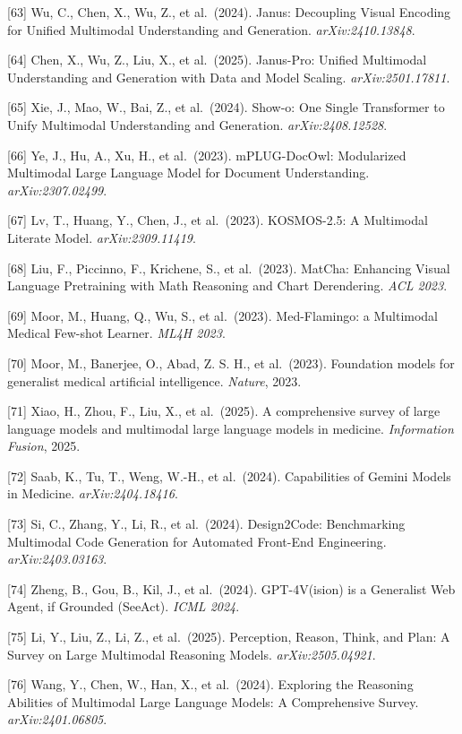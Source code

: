{[}63{]} Wu, C., Chen, X., Wu, Z., et al.~(2024). Janus: Decoupling Visual Encoding for Unified Multimodal Understanding and Generation. \emph{arXiv:2410.13848}.

{[}64{]} Chen, X., Wu, Z., Liu, X., et al.~(2025). Janus-Pro: Unified Multimodal Understanding and Generation with Data and Model Scaling. \emph{arXiv:2501.17811}.

{[}65{]} Xie, J., Mao, W., Bai, Z., et al.~(2024). Show-o: One Single Transformer to Unify Multimodal Understanding and Generation. \emph{arXiv:2408.12528}.

{[}66{]} Ye, J., Hu, A., Xu, H., et al.~(2023). mPLUG-DocOwl: Modularized Multimodal Large Language Model for Document Understanding. \emph{arXiv:2307.02499}.

{[}67{]} Lv, T., Huang, Y., Chen, J., et al.~(2023). KOSMOS-2.5: A Multimodal Literate Model. \emph{arXiv:2309.11419}.

{[}68{]} Liu, F., Piccinno, F., Krichene, S., et al.~(2023). MatCha: Enhancing Visual Language Pretraining with Math Reasoning and Chart Derendering. \emph{ACL 2023}.

{[}69{]} Moor, M., Huang, Q., Wu, S., et al.~(2023). Med-Flamingo: a Multimodal Medical Few-shot Learner. \emph{ML4H 2023}.

{[}70{]} Moor, M., Banerjee, O., Abad, Z. S. H., et al.~(2023). Foundation models for generalist medical artificial intelligence. \emph{Nature}, 2023.

{[}71{]} Xiao, H., Zhou, F., Liu, X., et al.~(2025). A comprehensive survey of large language models and multimodal large language models in medicine. \emph{Information Fusion}, 2025.

{[}72{]} Saab, K., Tu, T., Weng, W.-H., et al.~(2024). Capabilities of Gemini Models in Medicine. \emph{arXiv:2404.18416}.

{[}73{]} Si, C., Zhang, Y., Li, R., et al.~(2024). Design2Code: Benchmarking Multimodal Code Generation for Automated Front-End Engineering. \emph{arXiv:2403.03163}.

{[}74{]} Zheng, B., Gou, B., Kil, J., et al.~(2024). GPT-4V(ision) is a Generalist Web Agent, if Grounded (SeeAct). \emph{ICML 2024}.

{[}75{]} Li, Y., Liu, Z., Li, Z., et al.~(2025). Perception, Reason, Think, and Plan: A Survey on Large Multimodal Reasoning Models. \emph{arXiv:2505.04921}.

{[}76{]} Wang, Y., Chen, W., Han, X., et al.~(2024). Exploring the Reasoning Abilities of Multimodal Large Language Models: A Comprehensive Survey. \emph{arXiv:2401.06805}.


